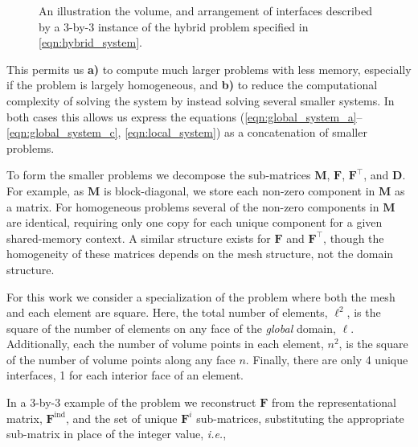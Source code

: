 %
%
%
\begin{figure}
	\centering
	
	\caption{An illustration the volume, and arrangement of interfaces described by a 3-by-3 instance of the hybrid problem specified in \eqref{eqn:hybrid_system}.}
	\label{fig:volume_diagram}
\end{figure}

%
%
%
\noindent
This permits us \textbf{a)} to compute much larger problems with less memory, especially if the problem is largely homogeneous, and \textbf{b)} to reduce the computational complexity of solving the system by instead solving several smaller systems. 
In both cases this allows us express the equations (\ref{eqn:global_system_a}--\ref{eqn:global_system_c}, \ref{eqn:local_system}) as a concatenation of smaller problems. 

%
%
%
To form the smaller problems we decompose the sub-matrices $\textbf{M}$, $\textbf{F}$, $\textbf{F}^{\intercal}$, and $\textbf{D}$. 
For example, as $\textbf{M}$ is block-diagonal, we store each non-zero component in $\textbf{M}$ as a matrix. 
For homogeneous problems several of the non-zero components in $\textbf{M}$ are identical, requiring only one copy for each unique component for a given shared-memory context.
A similar structure exists for $\textbf{F}$ and $\textbf{F}^{\intercal}$, though the homogeneity of these matrices depends on the mesh structure, not the domain structure. \\

%
%
%
\begin{aside}
    For this work we consider a specialization of the problem where both the mesh and each element are square. 
    Here, the total number of elements, $\ell^2$, is the square of the number of elements on any face of the \emph{global} domain, $\ell$. 
    Additionally, each the number of volume points in each element, $n^2$, is the square of the number of volume points along any face $n$. 
    Finally, there are only 4 unique interfaces, 1 for each interior face of an element.
\end{aside}

%
%
%
\noindent
In a 3-by-3 example of the problem we reconstruct $\textbf{F}$ from the representational matrix, $\textbf{F}^{\text{ind}}$, and the set of unique $\textbf{F}^{i}$ sub-matrices, substituting the appropriate sub-matrix in place of the integer value, \emph{i.e.},

